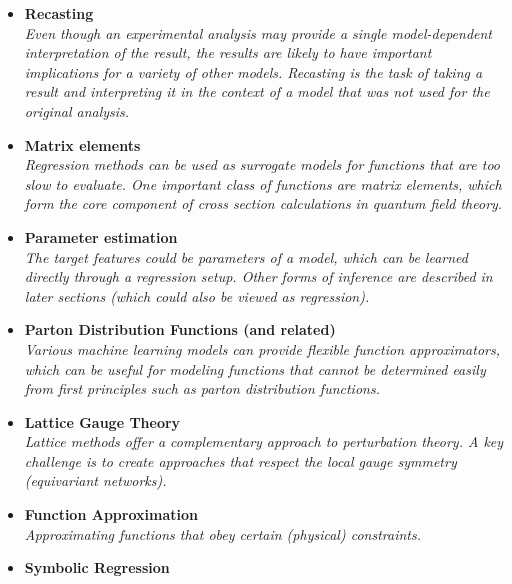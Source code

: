 \documentclass[12pt,letterpaper]{article}
\begin{document}
\begin{itemize}
\begin{itemize}
		\item \textbf{Recasting}~\cite{Caron:2017hku,Bertone:2016mdy,1806026}
		\\\textit{Even though an experimental analysis may provide a single model-dependent interpretation of the result, the results are likely to have important implications for a variety of other models.  Recasting is the task of taking a result and interpreting it in the context of a model that was not used for the original analysis.}
		\item \textbf{Matrix elements}~\cite{Badger:2020uow,Bishara:2019iwh,1804325,Bury:2020ewi,Sombillo:2021yxe,Sombillo:2021rxv,Aylett-Bullock:2021hmo,Maitre:2021uaa}
		\\\textit{Regression methods can be used as surrogate models for functions that are too slow to evaluate.  One important class of functions are matrix elements, which form the core component of cross section calculations in quantum field theory.}
		\item \textbf{Parameter estimation}~\cite{Lei:2020ucb,1808105,Lazzarin:2020uvv,Kim:2021pcz,Alda:2021rgt}
		\\\textit{The target features could be parameters of a model, which can be learned directly through a regression setup.  Other forms of inference are described in later sections (which could also be viewed as regression).}
		\item \textbf{Parton Distribution Functions (and related)}~\cite{DelDebbio:2020rgv,Grigsby:2020auv,Rossi:2020sbh,Carrazza:2021hny,Ball:2021leu,Ball:2021xlu,Khalek:2021gon}
		\\\textit{Various machine learning models can provide flexible function approximators, which can be useful for modeling functions that cannot be determined easily from first principles such as parton distribution functions.}
		\item \textbf{Lattice Gauge Theory}~\cite{Kanwar:2003.06413,Favoni:2020reg,Bulusu:2021rqz,Shi:2021qr,Hackett:2021idh,Yoon:2018krb,Zhang:2019qiq,Nguyen:2019gpo}
		\\\textit{Lattice methods offer a complementary approach to perturbation theory.  A key challenge is to create approaches that respect the local gauge symmetry (equivariant networks).}
		\item \textbf{Function Approximation}~\cite{1853982,Haddadin:2021mmo}
		\\\textit{Approximating functions that obey certain (physical) constraints.}
		\item \textbf{Symbolic Regression}~\cite{Butter:2021rvz}

\end{itemize}
\end{itemize}
\end{document}
